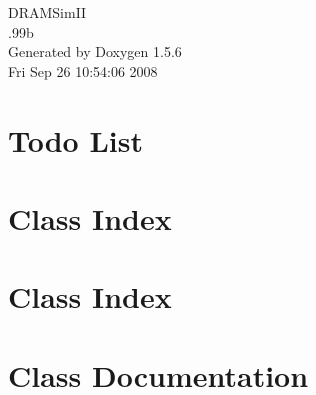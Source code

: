 \documentclass[a4paper]{book}
\begin{document}
\begin{titlepage}
\vspace*{7cm}
\begin{center}
{\Large DRAMSimII \\[1ex]\large .99b }\\
\vspace*{1cm}
{\large Generated by Doxygen 1.5.6}\\
\vspace*{0.5cm}
{\small Fri Sep 26 10:54:06 2008}\\
\end{center}
\end{titlepage}
\clearemptydoublepage
{}
\tableofcontents
\clearemptydoublepage
{}
\chapter{Todo List}
\label{todo}

\chapter{Class Index}

\chapter{Class Index}

\chapter{Class Documentation}























\printindex
\end{document}
